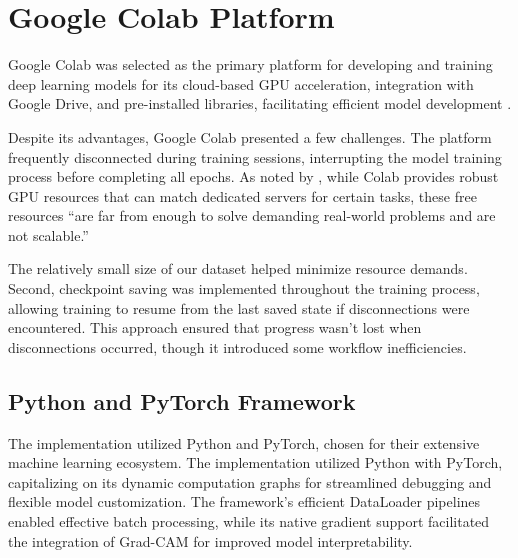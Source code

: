 \documentclass[a4paper,12pt]{report}
\begin{document}
\section{Google Colab Platform}

Google Colab was selected as the primary platform for developing and training deep learning models for its cloud-based GPU acceleration, integration with Google Drive, and pre-installed libraries, facilitating efficient model development \citep{geron2019}.

Despite its advantages, Google Colab presented a few challenges. The platform frequently disconnected during training sessions, interrupting the model training process before completing all epochs. As noted by \citep{carneiro2018}, while Colab provides robust GPU resources that can match dedicated servers for certain tasks, these free resources ``are far from enough to solve demanding real-world problems and are not scalable.''

The relatively small size of our dataset helped minimize resource demands. Second, checkpoint saving was implemented throughout the training process, allowing training to resume from the last saved state if disconnections were encountered. This approach ensured that progress wasn't lost when disconnections occurred, though it introduced some workflow inefficiencies.

\subsection{Python and PyTorch Framework}

The implementation utilized Python and PyTorch, chosen for their extensive machine learning ecosystem. The implementation utilized Python with PyTorch, capitalizing on its dynamic computation graphs for streamlined debugging and flexible model customization. The framework's efficient DataLoader pipelines enabled effective batch processing, while its native gradient support facilitated the integration of Grad-CAM for improved model interpretability.


\end{document}
